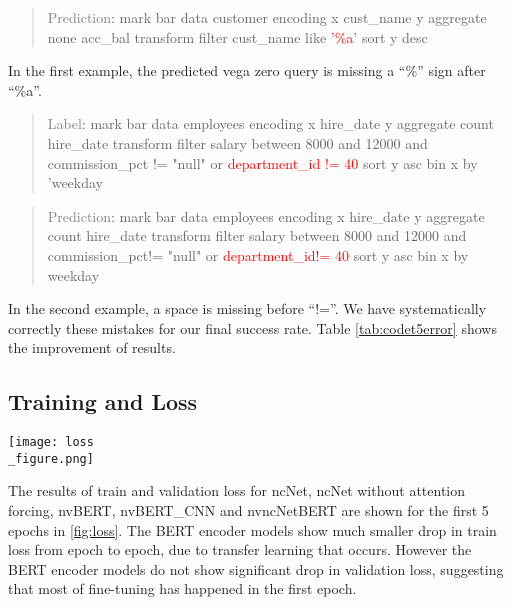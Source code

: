 \documentclass[
	a4paper, %
	10pt, %
	unnumberedsections, %
	twoside, %
]{t0003}
\newcommand{\gray}[1]{\textcolor{gray}{#1}}
\newcommand{\red}[1]{\textcolor{red}{#1}}
\begin{document}
\begin{appendices}
\begin{quote}
\gray{Prediction}: mark bar data customer encoding x cust\_name y aggregate none acc\_bal transform filter cust\_name like \red{'\%a'} sort y desc
\end{quote}

In the first example, the predicted vega zero query is missing a ``\%'' sign after ``\%a''.

\begin{quote}
\gray{Label}: mark bar data employees encoding x hire\_date y aggregate count hire\_date transform filter salary between 8000 and 12000 and commission\_pct != "null" or \red{department\_id != 40} sort y asc bin x by 'weekday
\end{quote}

\begin{quote}
\gray{Prediction}: mark bar data employees encoding x hire\_date y aggregate count hire\_date transform filter salary between 8000 and 12000 and commission\_pct!= "null" or \red{department\_id!= 40} sort y asc bin x by weekday
\end{quote}

In the second example, a space is missing before ``!=''. We have systematically correctly these mistakes for our final success rate. Table \ref{tab:codet5error} shows the improvement of results.

\subsection{Training and Loss}

\begin{figure*}
	\texttt{[image: loss\\\_figure.png]}
	\caption{Train and validation loss of models.}
	\label{fig:loss}
\end{figure*}

The results of train and validation loss for ncNet, ncNet without attention forcing, nvBERT, nvBERT\_CNN and nvncNetBERT are shown for the first 5 epochs in \ref{fig:loss}. The BERT encoder models show much smaller drop in train loss from epoch to epoch, due to transfer learning that occurs. However the BERT encoder models do not show significant drop in validation loss, suggesting that most of fine-tuning has happened in the first epoch.

\end{appendices}
\end{document}
